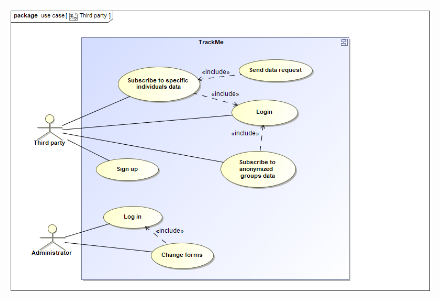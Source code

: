 \begin{figure}[h!] \ContinuedFloat
\centering
\includegraphics[scale=0.44]{sections/diagrams/Third_Party.png} \newline
{}
\end{figure}

\clearpage

